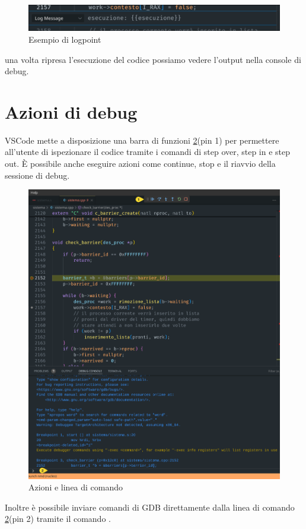 \begin{figure}[H]
    \centering
    \includegraphics[width=0.7\columnwidth]{images/logpoint.png}
    \caption{Esempio di logpoint}
    \label{fig:logpoint}
\end{figure}

una volta ripresa l'esecuzione del codice possiamo vedere l'output nella console di debug.

\section{Azioni di debug}

VSCode mette a disposizione una barra di funzioni \ref*{fig:middleDebug}(pin 1) per permettere all'utente di ispezionare il codice tramite i comandi di step over, step in e step out. È possibile anche eseguire azioni come continue, stop e il riavvio della sessione di debug.  

\begin{figure}[H]
    \centering
    \includegraphics[width=0.8\columnwidth]{images/middle_debug.png}
    \caption{Azioni e linea di comando}
    \label{fig:middleDebug}
\end{figure}

Inoltre è possibile inviare comandi di GDB direttamente dalla linea di comando \ref*{fig:middleDebug}(pin 2) tramite il comando .

